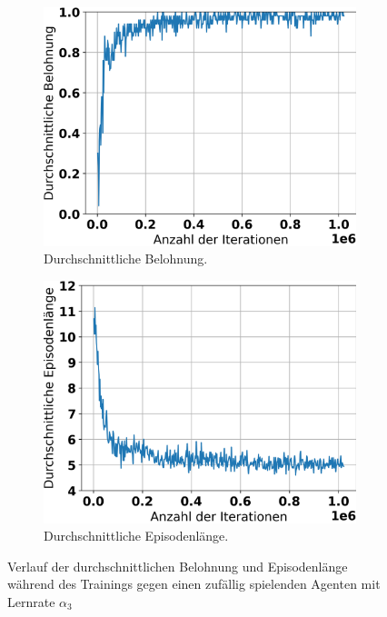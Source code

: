 \begin{figure}[ht!]%
	\begin{subfigure}[b]{0.48\textwidth}
		\includegraphics[width=\textwidth]{Bilder/random-training/history_random_0_0001_graph_episode_rewards.png}
		\caption{Durchschnittliche Belohnung.}
		\label{fig:f19}
	\end{subfigure}
	\hfill
	\begin{subfigure}[b]{0.48\textwidth}
		\includegraphics[width=\textwidth]{Bilder/random-training/history_random_0_0001_graph_episode_lengths.png}
		\caption{Durchschnittliche Episodenlänge.}
		\label{fig:f20}
	\end{subfigure}
	\caption{Verlauf der durchschnittlichen Belohnung und Episodenlänge während des Trainings gegen einen zufällig spielenden Agenten mit Lernrate $\alpha_3$}
\end{figure}


